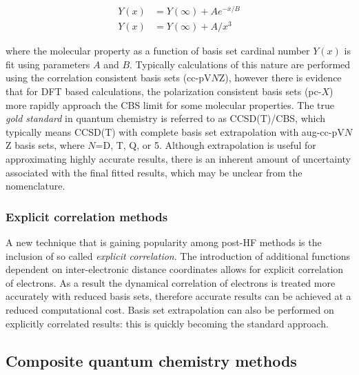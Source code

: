 \begin{doublespace}
\begin{align}
  Y(x) &= Y(\infty) + Ae^{-x/B} \\
  Y(x) &= Y(\infty) + A/x^3
\end{align}

\noindent where the molecular property as a function of basis set cardinal
number $Y(x)$ is fit using parameters $A$ and $B$. Typically calculations of
this nature are performed using the correlation consistent basis sets
(cc-pV$N$Z), however there is evidence that for DFT based calculations, the
polarization consistent basis sets (pc-$X$) more rapidly approach the CBS limit
for some molecular properties.\cite{Kupka2007} The true \emph{gold standard} in
quantum chemistry is referred to as CCSD(T)/CBS, which typically means CCSD(T)
with complete basis set extrapolation with aug-cc-pV$N$Z basis sets, where
$N$=D, T, Q, or 5. Although extrapolation is useful for approximating highly
accurate results, there is an inherent amount of uncertainty associated with the
final fitted results, which may be unclear from the nomenclature.

\subsubsection{Explicit correlation methods}

A new technique that is gaining popularity among post-HF methods is the
inclusion of so called \emph{explicit correlation}.\cite{Shiozaki2008,Kohn2008}
The introduction of additional functions dependent on inter-electronic distance
coordinates allows for explicit correlation of electrons.\cite{Tenno2012} As a
result the dynamical correlation of electrons is treated more accurately with
reduced basis sets, therefore accurate results can be achieved at a reduced
computational cost. Basis set extrapolation can also be performed on explicitly
correlated results: this is quickly becoming the standard
approach.\cite{Feller2013}


\subsection{Composite quantum chemistry methods}


\end{doublespace}
